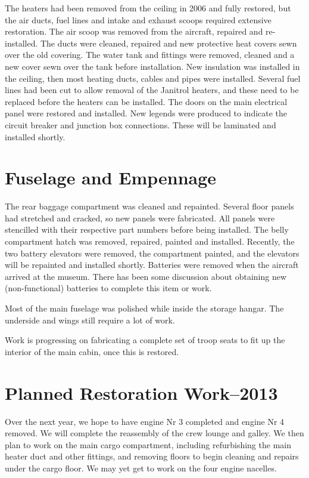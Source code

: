 The heaters had been removed from the ceiling in 2006 and fully
restored, but the air ducts, fuel lines and intake and exhaust scoops
required extensive restoration.  The air scoop was removed from the
aircraft, repaired and re-installed.  The ducts were cleaned, repaired
and new protective heat covers sewn over the old covering.  The water
tank and fittings were removed, cleaned and a new cover sewn over the
tank before installation.  New insulation was installed in the
ceiling, then most heating ducts, cables and pipes were installed.
Several fuel lines had been cut to allow removal of the Janitrol
heaters, and these need to be replaced before the heaters can be
installed.  The doors on the main electrical panel were restored and
installed.  New legends were produced to indicate the circuit breaker
and junction box connections.  These will be laminated and installed
shortly.

\section{Fuselage and Empennage}
\label{empenage}

The rear baggage compartment was cleaned and repainted.  Several floor
panels had stretched and cracked, so new panels were fabricated.  All
panels were stencilled with their respective part numbers before being
installed.  The belly compartment hatch was removed, repaired, painted
and installed.  Recently, the two battery elevators were removed, the
compartment painted, and the elevators will be repainted and installed
shortly.  Batteries were removed when the aircraft arrived at the
museum.  There has been some discussion about obtaining new
(non-functional) batteries to complete this item or work.

Most of the main fuselage was polished while inside the storage
hangar.  The underside and wings still require a lot of work.

Work is progressing on fabricating a complete set of troop seats to
fit up the interior of the main cabin, once this is restored.

\section{Planned Restoration Work--2013}
\label{sec:plannedwork}

Over the next year, we hope to have engine Nr 3 completed and engine
Nr 4 removed.  We will complete the reassembly of the crew lounge and
galley.  We then plan to work on the main cargo compartment, including
refurbishing the main heater duct and other fittings, and removing
floors to begin cleaning and repairs under the cargo floor.  We may
yet get to work on the four engine nacelles.

